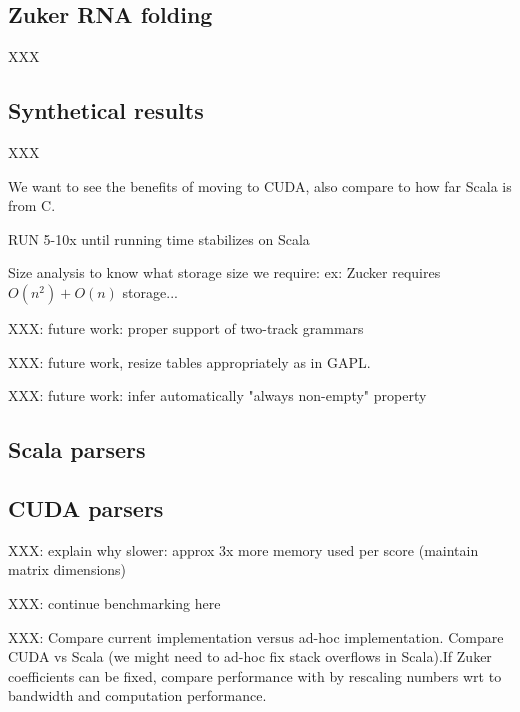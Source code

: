 \subsection{Zuker RNA folding}
XXX

\subsection{Synthetical results}
XXX

{\color{red} We want to see the benefits of moving to CUDA, also compare to how far Scala is from C.}

RUN 5-10x until running time stabilizes on Scala

 {\color{red} Size analysis to know what storage size we require: ex: Zucker requires $O(n^2)+O(n)$ storage...}

XXX: future work: proper support of two-track grammars

XXX: future work, resize tables appropriately as in GAPL.

XXX: future work: infer automatically "always non-empty" property

\subsection{Scala parsers}

\subsection{CUDA parsers}
{\color{red} XXX: explain why slower: approx 3x more memory used per score (maintain matrix dimensions)

XXX: continue benchmarking here
}

{\color{red} XXX: Compare current implementation versus ad-hoc implementation. Compare CUDA vs Scala (we might need to ad-hoc fix stack overflows in Scala).If Zuker coefficients can be fixed, compare performance with \cite{adp_gpu} by rescaling numbers wrt to bandwidth and computation performance.}

%

